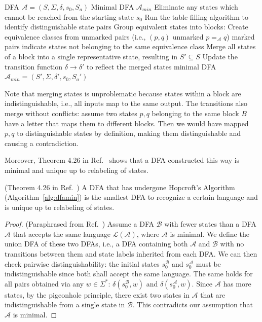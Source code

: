 \documentclass[../main.tex]{subfiles}
\begin{document}
\begin{algorithm}
\caption{DFA Minimization alias Hopcroft's Algorithm (adopted from Ref.~\cite{hopcroft2001introduction})}
\label{alg:dfamin}
\begin{algorithmic}[1]
\REQUIRE DFA $\mathcal{A} = (S, \Sigma, \delta, s_0, S_a)$
\ENSURE Minimal DFA $\mathcal{A}_{min}$
\STATE Eliminate any states which cannot be reached from the starting state $s_0$
\STATE Run the table-filling algorithm to identify distinguishable state pairs
\STATE Group equivalent states into blocks:
\STATE \quad Create equivalence classes from unmarked pairs (i.e., $(p,q)$ unmarked $p =_{\mathcal{A}} q$) 
\STATE \quad marked pairs indicate states not belonging to the same equivalence class
    \STATE Merge all states of a block into a single representative state, resulting in $S' \subseteq S$
\ENDFOR
\STATE Update the transition function $\delta \rightarrow \delta'$ to reflect the merged states
\STATE \RETURN minimal DFA $\mathcal{A}_{min} = (S', \Sigma, \delta', s_0, S_a')$
\end{algorithmic}
\end{algorithm}

Note that merging states is unproblematic because states within a block are indistinguishable, i.e., all inputs map to the same output. The transitions also merge without conflicts: assume two states $p,q$ belonging to the same block $B$ have a letter that maps them to different blocks. Then we would have mapped $p,q$ to distinguishable states by definition, making them distinguishable and causing a contradiction.

Moreover, Theorem 4.26 in Ref.~\cite{hopcroft2001introduction} shows that a \ac{DFA} constructed this way is minimal and unique up to relabeling of states.

\begin{theorem}\label{thr:minimaldfa} (Theorem 4.26 in Ref.~\cite{hopcroft2001introduction})  A DFA that has undergone Hopcroft's  Algorithm (Algorithm~\ref{alg:dfamin}) is the smallest DFA to recognize a certain language and is unique up to relabeling of states.
\end{theorem}

\begin{proof} (Paraphrased from Ref.~\cite{hopcroft2001introduction}) Assume a DFA $\mathcal{B}$ with fewer states than a DFA $\mathcal{A}$ that accepts the same language $\mathcal{L}(\mathcal{A})$, where $\mathcal{A}$ is minimal. We define the union DFA of these two DFAs, i.e., a DFA containing both $\mathcal{A}$ and $\mathcal{B}$ with no transitions between them and state labels inherited from each DFA. We can then check pairwise distinguishability: the initial states $s_0^{\mathcal{B}}$ and $s_0^{\mathcal{A}}$ must be indistinguishable since both shall accept the same language. The same holds for all pairs obtained via any $w \in \Sigma^*$: $\delta(s_0^{\mathcal{B}},w)$ and $\delta(s_0^{\mathcal{A}},w)$. Since $\mathcal{A}$ has more states, by the pigeonhole principle, there exist two states in $\mathcal{A}$ that are indistinguishable from a single state in $\mathcal{B}$. This contradicts our assumption that $\mathcal{A}$ is minimal.
\end{proof}
\end{document}
